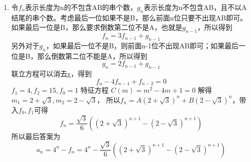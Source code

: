 \documentclass[a4paper]{article}
\begin{document}
\begin{enumerate}[]
\item 
\begin{solution}
    令$f_n$表示长度为n的不包含AB的串个数，$g_n$表示长度为n不包含AB，且不以A结尾的串个数。考虑最后一位如果不是B，那么前面n位只要不出现AB即可。如果最后一位是B，那么要求倒数第二位不是A，也就是$g_{n-1}$，所以得到
    \begin{equation*}
        f_n= 3 f_{n-1} + g_{n-1}
    \end{equation*}
    另外对于$g_n$，如果最后一位不是B，则前面n-1位不出现AB即可；如果最后一位是B，那么倒数第二位不能是A，所以得到
    \begin{equation*}
        g_n = 2 f_{n-1} + g_{n-1}
    \end{equation*}
    联立方程可以消去g，得到
    \begin{equation*}
        f_n -4 f_{n-1} +f_{n-2} = 0
    \end{equation*}
    $f_1=4,f_2=15,f_0=1$
    特征方程 $C(m) = m^2 -4m+1 =0$ 解得$m_1 = 2+\sqrt{3},m_2 = 2-\sqrt{3}$，
    所以$f_n = A (2+\sqrt{3})^n + B(2-\sqrt{3})^n$，带入$f_0,f_1$可得
    \begin{equation*}
        f_n = \frac{\sqrt{3}}{6} ((2+\sqrt{3})^{n+1} - (2-\sqrt{3})^{n+1}) 
    \end{equation*}
    所以最后答案为
    \begin{equation*}
        a_n = 4^n - f_n = 4^n - \frac{\sqrt{3}}{6} ((2+\sqrt{3})^{n+1} - (2-\sqrt{3})^{n+1}) 
    \end{equation*}
\end{solution}


\end{enumerate}
\end{document}
